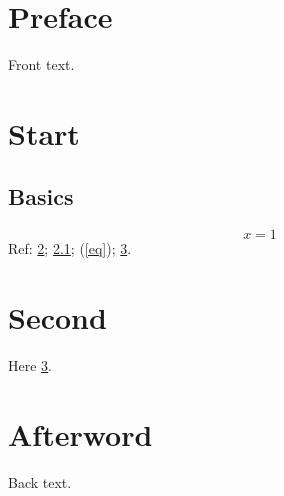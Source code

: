\documentclass{scrbook}
\begin{document}
\frontmatter
\chapter{Preface}\label{preface}
Front text.
\tableofcontents
\mainmatter
\chapter{Start}\label{start}
\section{Basics}\label{basics}
\begin{equation}
x = 1 \label{eq}
\end{equation}
Ref: \ref{start}; \ref{basics}; (\ref{eq}); \ref{second}.
\chapter{Second}\label{second}
Here \ref{second}.
\backmatter
\chapter{Afterword}\label{afterword}
Back text.
\end{document}
